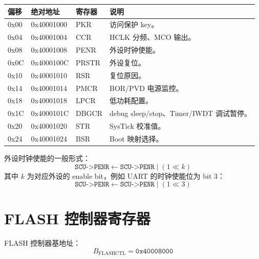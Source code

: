 \documentclass[UTF8,a4paper,11pt]{ctexart}
\newcommand{\addr}[1]{\texttt{#1}}
\newcommand{\reg}[1]{\texttt{#1}}
\begin{document}
\begin{longtable}{>{\ttfamily}p{2cm}>{\ttfamily}p{3cm}p{2.6cm}p{6cm}}
\toprule
偏移 & 绝对地址 & 寄存器 & 说明 \\
\midrule
\endhead
0x00 & 0x40001000 & PKR & 访问保护 key。\\
0x04 & 0x40001004 & CCR & HCLK 分频、MCO 输出。\\
0x08 & 0x40001008 & PENR & 外设时钟使能。\\
0x0C & 0x4000100C & PRSTR & 外设复位。\\
0x10 & 0x40001010 & RSR & 复位原因。\\
0x14 & 0x40001014 & PMCR & BOR/PVD 电源监控。\\
0x18 & 0x40001018 & LPCR & 低功耗配置。\\
0x1C & 0x4000101C & DBGCR & debug sleep/stop、Timer/IWDT 调试暂停。\\
0x20 & 0x40001020 & STR & SysTick 校准值。\\
0x24 & 0x40001024 & BSR & Boot 映射选择。\\
\bottomrule
\end{longtable}

外设时钟使能的一般形式：
\[
  \reg{SCU->PENR} \gets \reg{SCU->PENR} \mathbin{|} (1 \ll k)
\]
其中 $k$ 为对应外设的 enable bit，例如 UART 的时钟使能位为 bit 3：
\[
  \reg{SCU->PENR} \gets \reg{SCU->PENR} \mathbin{|} (1 \ll 3)
\]

\section{FLASH 控制器寄存器}

FLASH 控制器基地址：
\[
  B_{\mathrm{FLASHCTL}} = \addr{0x40008000}
\]
\end{document}
